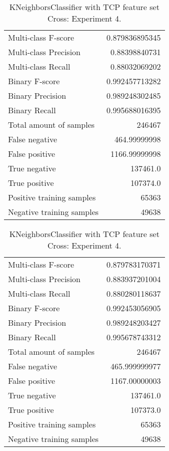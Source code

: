 \begin{table}[H]
\begin{minipage}{0.5\textwidth}
\caption{KNeighborsClassifier with TCP feature set Cross: Experiment 3.}
\centering
\begin{tabular}{l r}
\toprule
Multi-class F-score & 0.879836895345 \\
Multi-class Precision & 0.88398840731 \\
Multi-class Recall & 0.88032069202 \\
\midrule
Binary F-score & 0.992457713282 \\
Binary Precision & 0.989248302485 \\
Binary Recall & 0.995688016395 \\
\midrule
Total amount of samples & 246467 \\
False negative & 464.99999998 \\
False positive & 1166.99999998 \\
True negative & 137461.0 \\
True positive & 107374.0 \\
\midrule
Positive training samples & 65363 \\
Negative training samples & 49638 \\
\bottomrule
\end{tabular}
\end{minipage}
\hfillx
\begin{minipage}{0.5\textwidth}
\caption{KNeighborsClassifier with TCP feature set Cross: Experiment 4.}
\centering
\begin{tabular}{l r}
\toprule
Multi-class F-score & 0.879783170371 \\
Multi-class Precision & 0.883937201004 \\
Multi-class Recall & 0.880280118637 \\
\midrule
Binary F-score & 0.992453056905 \\
Binary Precision & 0.989248203427 \\
Binary Recall & 0.995678743312 \\
\midrule
Total amount of samples & 246467 \\
False negative & 465.999999977 \\
False positive & 1167.00000003 \\
True negative & 137461.0 \\
True positive & 107373.0 \\
\midrule
Positive training samples & 65363 \\
Negative training samples & 49638 \\
\bottomrule
\end{tabular}
\end{minipage}
\end{table}
